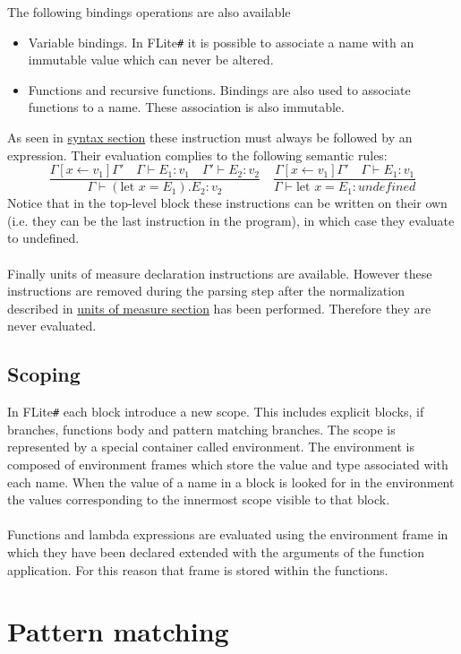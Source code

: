 \documentclass[]{article}
\begin{document}
		The following bindings operations are also available
		\begin{itemize}
			\item Variable bindings. In FLite\verb|#| it is possible to associate a name with an immutable value which can never be altered.
			\item Functions and recursive functions. Bindings are also used to associate functions to a name. These association is also immutable.
		\end{itemize}
		As seen in \hyperref[sec:syntax]{syntax section} these instruction must always be followed by an expression. Their evaluation complies to the following semantic rules:
		\[
		\frac{\Gamma[x \leftarrow v_1]\Gamma' \quad \Gamma \vdash E_1: v_1 \quad \Gamma' 	\vdash E_2: v_2}{\Gamma \vdash (\text{let } x = E_1).E_2: v_2} \quad
		\frac{\Gamma[x \leftarrow v_1]\Gamma' \quad \Gamma \vdash E_1: v_1 }{\Gamma \vdash \text{let } x = E_1: undefined}
		\]
		Notice that in the top-level block these instructions can be written on their own (i.e. they can be the last instruction in the program), in which case they evaluate to undefined.\\\\
		Finally units of measure declaration instructions are available. However these instructions are removed during the parsing step after the normalization described in \hyperref[sec:UOM]{units of measure section} has been performed. Therefore they are never evaluated.
		
		\subsection{Scoping}
			In FLite\verb|#| each block introduce a new scope. This includes explicit blocks, if branches, functions body and pattern matching branches. The scope is represented by a special container called environment. The environment is composed of environment frames which store the value and type associated with each name. When the value of a name in a block is looked for in the environment the values corresponding to the innermost scope visible to that block.\\\\
			Functions and lambda expressions are evaluated using the environment frame in which they have been declared extended with the arguments of the function application. For this reason that frame is stored within the functions.
	
	\section{Pattern matching}
	\label{sec:patternMatching}
	
\end{document}
